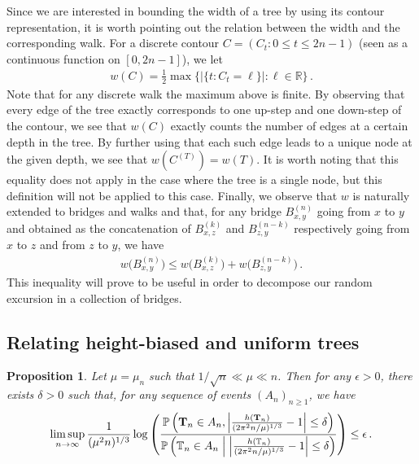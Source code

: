 \documentclass{article}
\newcommand{\pr}{\mathbb{P}}								%
\newcommand{\Prob}[1]{\pr\left(#1\right)}					%
\newcommand{\CProb}[2]{\pr\left(#1 \Bigm| #2\right)}	%
\newcommand{\1}{\mathbbm{1}}								%
\newtheorem{proposition}[theorem]{Proposition}
\theoremstyle{definition}
\numberwithin{equation}{section}
\newcommand{\bT}{\mathbf T}
\newcommand{\T}{\mathbb T}
\newcommand{\R}{\mathbb R}
\begin{document}
Since we are interested in bounding the width of a tree by using its contour representation, it is worth pointing out the relation between the width and the corresponding walk.
For a discrete contour $C=(C_t:0\leq t\leq 2n-1)$ (seen as a continuous function on $[0,2n-1]$), we let
\begin{align*}
    w(C)=\frac{1}{2}\max\Big\{\big|\{t:C_t=\ell\}\big|:\ell\in\R\Big\}\,.
\end{align*}
Note that for any discrete walk the maximum above is finite. By observing that every edge of the tree exactly corresponds to one up-step and one down-step of the contour, we see that $w(C)$ exactly counts the number of edges at a certain depth in the tree.
By further using that each such edge leads to a unique node at the given depth, we see that $w(C^{(T)})=w(T)$.
It is worth noting that this equality does not apply in the case where the tree is a single node, but this definition will not be applied to this case.
Finally, we observe that $w$ is naturally extended to bridges and walks and that, for any bridge $B^{(n)}_{x,y}$ going from $x$ to $y$ and obtained as the concatenation of $B^{(k)}_{x,z}$ and $B^{(n-k)}_{z,y}$ respectively going from $x$ to $z$ and from $z$ to $y$, we have
\begin{align*}
    w\big(B^{(n)}_{x,y}\big)\leq w\big(B^{(k)}_{x,z}\big)+w\big(B^{(n-k)}_{z,y}\big)\,.
\end{align*}
This inequality will prove to be useful in order to decompose our random excursion in a collection of bridges.

\subsection{Relating height-biased and uniform trees}

\begin{proposition}\label{prop:contour_random_narrow_exc_pos}
    Let $\mu=\mu_n$ such that $1/\sqrt{n}\ll\mu\ll n$.
    Then for any $\epsilon>0$, there exists $\delta>0$ such that, for any sequence of events $(A_n)_{n\geq1}$, we have
    \begin{align*}
        \limsup_{n\rightarrow\infty}\frac{1}{(\mu^2n)^{1/3}}\log\left(\frac{\Prob{\bT_n\in A_n,\left|\frac{h(\bT_n)}{(2\pi^2n/\mu)^{1/3}}-1\right|\leq\delta}}{\CProb{\T_n\in A_n}{\left|\frac{h(\T_n)}{(2\pi^2n/\mu)^{1/3}}-1\right|\leq\delta}}\right)\leq\epsilon\,.
    \end{align*}
\end{proposition}
\end{document}
